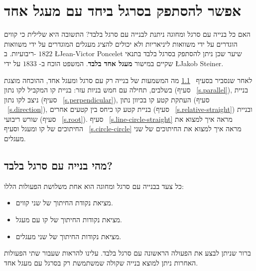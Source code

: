 
\chapter{אפשר להסתפק בסרגל ביחד עם מעגל אחד}\label{c.straightedge}


האם כל בנייה עם סרגל ומחוגה ניתנת לבנייה עם סרגל בלבד? התשובה היא שלילית כי קווים הוגדרים על ידי משוואות ליניאריות ולא יכולים להציג מעגלים המוגדרים על ידי משוואות ריבועיות. ב-%
$1822$
\L{Jean-Victor Poncelet}
שיער שכן ניתן להסתפק בסרגל בלבד בתנאי שקיים במישור 
\textbf{מעגל אחד בלבד}.
המשפט הוכח ב-%
$1833$
על ידי
\L{Jakob Steiner}.

לאחר שנסביר בסעיף%
~\ref{s.se-what}
מה המשמעות של בנייה רק עם סרגל ומעגל אחד, ההוכחה מוצגת בשלבים, תחילה עם חמש בניות עזר: בניית קו המקביל לקו נתון (סעיף%
~\ref{s.parallel}),
בניית ניצב לקו נתון (סעיף%
~\ref{s.perpendicular}),
העתקת קטע קו בכיוון נתון (סעיף%
~\ref{s.direction}), 
בניית קטע קו כיחס בין קטעים אחרים (סעיף%
~\ref{s.relative-straight})
ובניית שורש ריבועי (סעיף%
~\ref{s.root}).
סעיף%
~\ref{s.line-circle-straight}
מראה איך למצוא את החיתוכים של קו ומעגל וסעיף%
~\ref{s.circle-circle}
מראה איך למצוא את החיתוכים של שני מעגלים.


\section{מהי בנייה עם סרגל בלבד?}\label{s.se-what}

כל צעד בבנייה עם סרגל ומחוגה הוא אחת משלושת הפעולות הללו:
\begin{itemize}
\setlength{\itemsep}{0pt}
\item
מציאת נקודת החיתוך של שני קווים.
\item
מציאת נקודות החיתוך של קו עם מעגל.
\item
מציאת נקודות החיתוך של שני מעגלים.
\end{itemize}
ברור שניתן לבצע את הפעולה הראשונה עם סרגל בלבד. עלינו להראות שעבור שתי הפעולות האחרות ניתן למוצא בנייה שקולה שמשתמשת רק בסרגל עם מעגל אחד.


